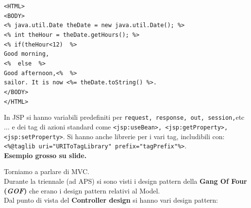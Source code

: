 \documentclass[a4paper,12pt, oneside]{book}
\begin{document}
\begin{shaded}
\begin{esempio}
    \texttt{<HTML>\\
      <BODY>\\
      <\% java.util.Date theDate = new java.util.Date(); \%>\\
      <\% int theHour = theDate.getHours(); \%>\\
      <\% if(theHour<12) { \%>\\
        Good morning,\\
        <\% } else { \%>\\
        Good afternoon,<\% } \%>\\
      sailor. It is now <\%= theDate.toString() \%>.\\
      </BODY>\\
      </HTML>}
  \end{esempio}
  In JSP si hanno variabili predefiniti per \texttt{request, response, out,
    session,}etc$\ldots$ e dei tag di azioni standard come
  \texttt{<jsp:useBean>, <jsp:getProperty>, <jsp:setProperty>}. Si hanno anche
  librerie per i vari tag, includibili con:
  \texttt{<\%@taglib uri="URIToTagLibrary" prefix="tagPrefix"\%>}.\\
  \textbf{Esempio grosso su slide.}
\end{shaded}
\newpage
Torniamo a parlare di MVC.\\
Durante la triennale (ad APS) si sono visti i design pattern della \textbf{Gang
  Of Four (\textit{GOF})} che erano i design pattern relativi al Model.\\
Dal punto di vista del \textbf{Controller design} si hanno vari design pattern:
\end{document}
